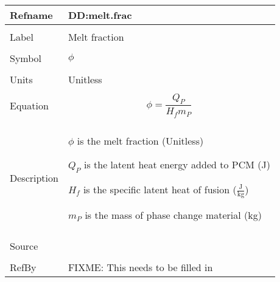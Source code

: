 \documentclass[12pt]{article}
\begin{document}
\noindent \begin{minipage}{\textwidth}
\begin{tabular}{p{} p{}}
\toprule \textbf{Refname} & \textbf{DD:melt.frac}
\label{DD:melt.frac}
\\ \midrule \\
Label & Melt fraction
\\ \midrule \\
Symbol & $ϕ$
\\ \midrule \\
Units & Unitless
\\ \midrule \\
Equation & \begin{dmath}
           ϕ=\frac{{Q_{P}}}{{H_{f}} {m_{P}}}
           \end{dmath}
\\ \midrule \\
Description & \begin{symbDescription}
              \item{$ϕ$ is the melt fraction (Unitless)}
              \item{${Q_{P}}$ is the latent heat energy added to PCM (J)}
              \item{${H_{f}}$ is the specific latent heat of fusion ($\frac{\text{J}}{\text{kg}}$)}
              \item{${m_{P}}$ is the mass of phase change material (kg)}
              \end{symbDescription}
\\ \midrule \\
Source & 
\\ \midrule \\
RefBy & FIXME: This needs to be filled in
\\ \bottomrule \end{tabular}
\end{minipage}\\
\end{document}
